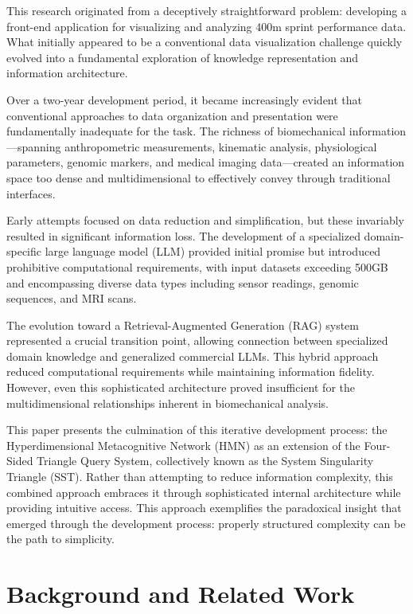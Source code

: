 \documentclass[journal,onecolumn]{IEEEtran}
\begin{document}
This research originated from a deceptively straightforward problem: developing a front-end application for visualizing and analyzing 400m sprint performance data. What initially appeared to be a conventional data visualization challenge quickly evolved into a fundamental exploration of knowledge representation and information architecture.

Over a two-year development period, it became increasingly evident that conventional approaches to data organization and presentation were fundamentally inadequate for the task. The richness of biomechanical information—spanning anthropometric measurements, kinematic analysis, physiological parameters, genomic markers, and medical imaging data—created an information space too dense and multidimensional to effectively convey through traditional interfaces.

Early attempts focused on data reduction and simplification, but these invariably resulted in significant information loss. The development of a specialized domain-specific large language model (LLM) provided initial promise but introduced prohibitive computational requirements, with input datasets exceeding 500GB and encompassing diverse data types including sensor readings, genomic sequences, and MRI scans.

The evolution toward a Retrieval-Augmented Generation (RAG) system represented a crucial transition point, allowing connection between specialized domain knowledge and generalized commercial LLMs. This hybrid approach reduced computational requirements while maintaining information fidelity. However, even this sophisticated architecture proved insufficient for the multidimensional relationships inherent in biomechanical analysis.

This paper presents the culmination of this iterative development process: the Hyperdimensional Metacognitive Network (HMN) as an extension of the Four-Sided Triangle Query System, collectively known as the System Singularity Triangle (SST). Rather than attempting to reduce information complexity, this combined approach embraces it through sophisticated internal architecture while providing intuitive access. This approach exemplifies the paradoxical insight that emerged through the development process: properly structured complexity can be the path to simplicity.

\section{Background and Related Work}
\end{document}
